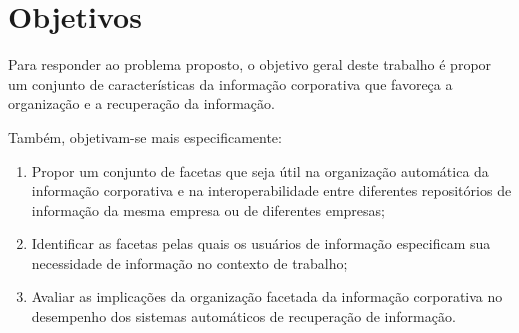 
\section{Objetivos} %

Para responder ao problema proposto, o objetivo geral deste trabalho é propor um conjunto de características da informação corporativa que favoreça a organização e a recuperação da informação.


Também, objetivam-se mais especificamente:

\begin{enumerate}
	\item Propor um conjunto de facetas que seja útil na organização automática da informação corporativa e na interoperabilidade entre diferentes repositórios de informação da mesma empresa ou de diferentes empresas;

	\item Identificar as facetas pelas quais os usuários de informação especificam sua necessidade de informação no contexto de trabalho;

	\item Avaliar as implicações da organização facetada da informação corporativa no desempenho dos sistemas automáticos de recuperação de informação.

\end{enumerate}

